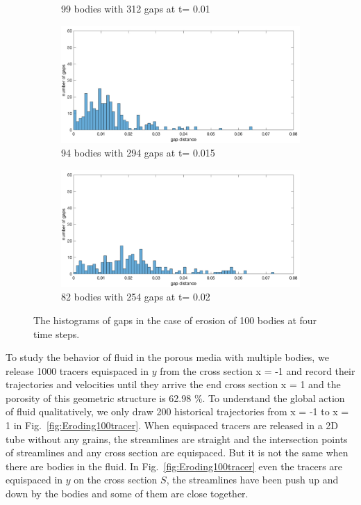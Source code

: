 \documentclass[preprint, 10pt]{elsarticle}
\begin{document}
{\begin{figure}[H]
\begin{subfigure}[b]{0.5\textwidth}
\caption{99 bodies with 312 gaps at t= 0.01}
\end{subfigure}
\begin{subfigure}[b]{0.5\textwidth}
\includegraphics*[width =\linewidth]{./figs/gap_hist100_150}
\caption{94 bodies with 294 gaps at t= 0.015}
\end{subfigure}%
\begin{subfigure}[b]{0.5\textwidth}
\includegraphics*[width =\linewidth]{./figs/gap_hist100_200}
\caption{82 bodies with 254 gaps at t= 0.02}
\end{subfigure}
\caption{\label{fig:Eroding100gap} The histograms of gaps in the case of erosion of 100 bodies at four time steps.}
\end{figure}

To study the behavior of fluid in the porous media with multiple bodies, 
we release 1000 tracers equispaced in $y$ from the 
cross section x = -1 and record their trajectories and velocities
until they arrive the end cross section x = 1 
and the porosity of this geometric structure is 62.98 \%. 
To understand the global action of fluid qualitatively, 
we only draw 200 historical trajectories from x = -1 to x = 1 
in Fig.~\ref{fig:Eroding100tracer}. 
When equispaced tracers are released in a 2D tube without any grains, 
the streamlines are straight 
and the intersection points of streamlines and any cross section are equispaced. 
But it is not the same when there are bodies in the fluid. 
In Fig.~\ref{fig:Eroding100tracer}
even the tracers are equispaced in $y$ on the cross section $S$, 
the streamlines have been push up and down by the bodies and
some of them are close together. 




}
\end{document}
